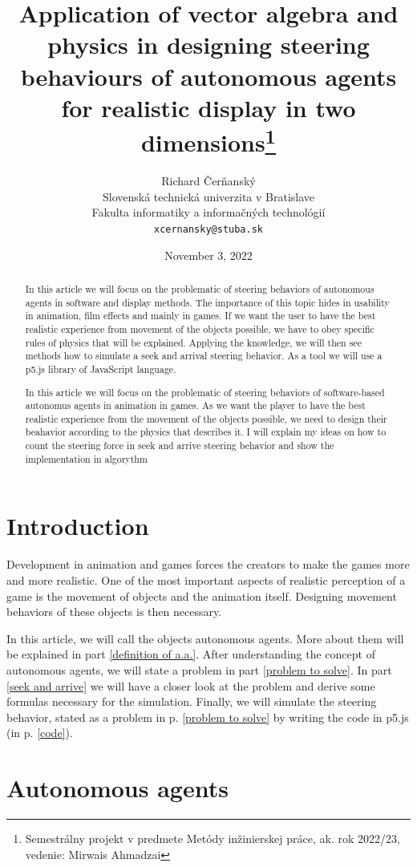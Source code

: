 \documentclass[10pt,twoside,english,a4paper]{article}
\title{Application of vector algebra and physics in designing steering behaviours of autonomous agents for realistic display in two dimensions\thanks{Semestrálny projekt v predmete Metódy inžinierskej práce, ak. rok 2022/23, vedenie: Mirwais Ahmadzai}}
\author{Richard Čerňanský\\[2pt]
	{\small Slovenská technická univerzita v Bratislave}\\
	{\small Fakulta informatiky a informačných technológií}\\
	{\small \texttt{xcernansky@stuba.sk}}
	}
\date{\small November 3, 2022 }
\begin{document}
\maketitle

\begin{abstract}

In this article we will focus on the problematic of steering behaviors of autonomous agents in software and display methods. The importance of this topic hides in usability in animation, film effects and mainly in games. If we want the user to have the best realistic experience from movement of the objects possible, we have to obey specific rules of physics that will be explained. Applying the knowledge, we will then see methods how to simulate a seek and arrival steering behavior. As a tool we will use a p5.js library of JavaScript language.

In this article we will focus on the problematic of steering behaviors of software-based autonomus agents in animation in games. As we want the player to have the best realistic experience from the movement of the objects possible, we need to design their beahavior according to the physics that describes it. I will explain my ideas on how to count the steering force in seek and arrive steering behavior and show the implementation in algorythm

\end{abstract}

\section{Introduction}

Development in animation and games forces the creators to make the games more and more realistic. One of the most important aspects of realistic perception of a game is the movement of objects and the animation itself. Designing movement behaviors of these objects is then necessary. 

In this article, we will call the objects autonomous agents. More about them will be explained in part \ref{definition of a.a.}. After understanding the concept of autonomous agents, we will state a problem in part \ref{problem to solve}. In part \ref{seek and arrive} we will have a closer look at the problem and derive some formulas necessary for the simulation. Finally, we will simulate the steering behavior, stated as a problem in p. \ref{problem to solve} by writing the code in p5.js (in p. \ref{code}).

\section{Autonomous agents} \label{autonomous agents}
\end{document}
